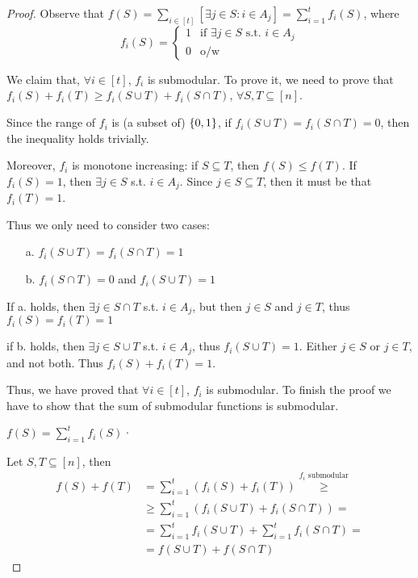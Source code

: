     \begin{proof}
        Observe that $f(S) = \sum_{i \in [t]} [\exists j \in S : i \in A_j] = \sum_{i=1}^{t} f_i(S)$, where
        \begin{equation}
            f_i(S) =
            \begin{cases}
                1 & \text{if } \exists j \in S \text{ s.t. } i \in A_j\\
                0 & \text{o/w}
            \end{cases}
        \end{equation}

        We claim that, $\forall i \in [t]$, $f_i$ is submodular.
        To prove it, we need to prove that $f_i(S) + f_i(T) \geq f_i(S \cup T) + f_i(S \cap T)$, $\forall S,T \subseteq [n]$.

        Since the range of $f_i$ is (a subset of) $\{ 0,1 \}$, if $f_i(S \cup T) = f_i(S \cap T) = 0$, then the inequality holds trivially.

        Moreover, $f_i$ is monotone increasing: if $S \subseteq T$, then $f(S) \leq f(T)$.
        If $f_i(S) = 1$, then $\exists j \in S$ s.t. $i \in A_j$. Since $j \in S \subseteq T$, then it must be that $f_i(T) = 1$.

        Thus we only need to consider two cases:
        \begin{itemize}
            \item[a.] $f_i(S \cup T) = f_i(S \cap T) = 1$
            \item[b.] $f_i(S \cap T) = 0$ and $f_i(S \cup T) = 1$
        \end{itemize}

        If a. holds, then $\exists j \in S \cap T$ s.t. $i \in A_j$, but then $j \in S$ and $j \in T$, thus $f_i(S) = f_i(T) = 1$

        if b. holds, then $\exists j \in S \cup T$ s.t. $i \in A_j$, thus $f_i(S \cup T) = 1$. Either $j \in S$ or $j \in T$, and not both. Thus $f_i(S) + f_i(T) = 1$.

        Thus, we have proved that $\forall i \in [t]$, $f_i$ is submodular.
        To finish the proof we have to show that the sum of submodular functions is submodular.

        $f(S) = \sum_{i=1}^{t} f_i(S)$·

        Let $S,T \subseteq [n]$, then
        \begin{equation*}
            \begin{split}
                f(S) + f(T) &= \sum_{i=1}^{t} (f_i(S) + f_i(T)) \overset{f_i \text{ submodular}}{\geq}\\
                    &\geq \sum_{i=1}^{t}(f_i(S \cup T) + f_i(S \cap T)) =\\
                    &= \sum_{i=1}^{t} f_i(S \cup T) + \sum_{i=1}^{t} f_i (S \cap T) =\\
                    &= f(S \cup T) + f(S \cap T)
            \end{split}
        \end{equation*}
    \end{proof}


